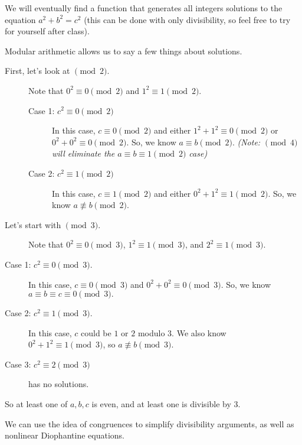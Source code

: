 \documentclass{ximera}
\begin{document}
\begin{example}
 We will eventually find a function that generates all integers solutions to the equation $a^2+b^2=c^2$ (this can be done with only divisibility, so feel free to try for yourself after class).
 
 Modular arithmetic allows us to say a few things about solutions. 
 \begin{description}
 \item[First, let's look at $\!\pmod 2$.] Note that $0^2\equiv 0 \pmod 2$ and $1^2\equiv 1 \pmod 2$.

\begin{description}
 \item[Case 1: $c^2\equiv 0 \pmod 2$] In this case, $c\equiv 0\pmod 2$ and either $1^2+1^2\equiv 0\pmod 2$ or $0^2+0^2\equiv 0\pmod 2$. So, we know $a\equiv b\pmod 2.$ \emph{(Note: $\!\pmod 4$ will eliminate the $a\equiv b\equiv 1 \pmod 2$ case)}
  \item[Case 2: $c^2\equiv 1 \pmod 2$] In this case, $c\equiv 1\pmod 2$ and either $0^2+1^2\equiv 1\pmod 2$. So, we know $a\not\equiv b\pmod 2.$
\end{description}

\item[Let's start with $\!\pmod 3$.] Note that $0^2\equiv 0 \pmod 3$, $1^2\equiv 1 \pmod 3$, and $2^2\equiv 1 \pmod 3$.
\end{description} 

\begin{description}
 \item[Case 1: $c^2\equiv 0 \pmod 3$.] In this case, $c\equiv 0\pmod 3$ and $0^2+0^2\equiv 0\pmod 3$. So, we know $a\equiv b\equiv c\equiv 0\pmod 3.$ 
  \item[Case 2: $c^2\equiv 1 \pmod 3$.] In this case, $c$ could be $1$ or $2$ modulo $3$. We also know $0^2+1^2\equiv 1\pmod 3$, so  $a\not\equiv b\pmod 3.$
  \item[Case 3: $c^2\equiv 2 \pmod 3$] has no solutions.
\end{description}

So at least one of $a,b,c$ is even, and at least one is divisible by $3$.
\end{example}

We can use the idea of congruences to simplify divisibility arguments, as well as nonlinear Diophantine equations.
\end{document}
